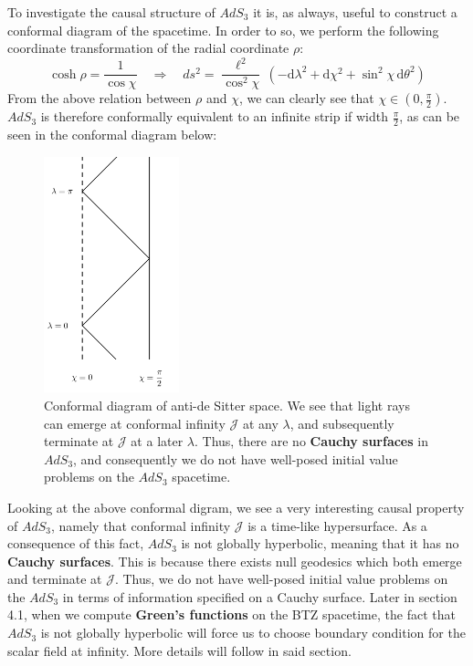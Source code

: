 To investigate the causal structure of $AdS_3$ it is, as always, useful to construct a conformal diagram of the spacetime. In order to so, we perform the following coordinate transformation of the radial coordinate $\rho$:
%
%
\begin{equation}
\cosh\rho = \frac{1}{\cos\chi}
\quad \Rightarrow \quad
ds^2 = \frac{\ell^2}{\cos^2\chi} \, \left(
- \mathrm{d}\lambda^2
+ \mathrm{d}\chi^2
+ \sin^2\chi \, \mathrm{d}\theta^2
\right)
\end{equation}
%
%
From the above relation between $\rho$ and $\chi$, we can clearly see that $\chi \in \left( 0, \frac{\pi}{2} \right)$. $AdS_3$ is therefore conformally equivalent to an infinite strip if width $\frac{\pi}{2}$, as can be seen in the conformal diagram below:
%
\newpage
%
%
\begin{figure}[h!]
%
\centering
%
\includegraphics[width=0.35\textwidth]{../pics/AdS3_Pen.png}
%
\caption{Conformal diagram of anti-de Sitter space. We see that light rays can emerge at conformal infinity $\mathcal{J}$ at any $\lambda$, and subsequently terminate at $\mathcal{J}$ at a later $\lambda$. Thus, there are no \textbf{Cauchy surfaces} in $AdS_3$, and consequently we do not have well-posed initial value problems on the $AdS_3$ spacetime.}
%
\label{fig:penrose_ads}
%
\end{figure}
%
%
\noindent
%
Looking at the above conformal digram, we see a very interesting causal property of $AdS_3$, namely that conformal infinity $\mathcal{J}$ is a time-like hypersurface. As a consequence of this fact, $AdS_3$ is not globally hyperbolic, meaning that it has no \textbf{Cauchy surfaces}. This is because there exists null geodesics which both emerge and terminate at $\mathcal{J}$. Thus, we do not have well-posed initial value problems on the $AdS_3$ in terms of information specified on a Cauchy surface. Later in section 4.1, when we compute \textbf{Green's functions} on the BTZ spacetime, the fact that $AdS_3$ is not globally hyperbolic will force us to choose boundary condition for the scalar field at infinity. More details will follow in said section.

